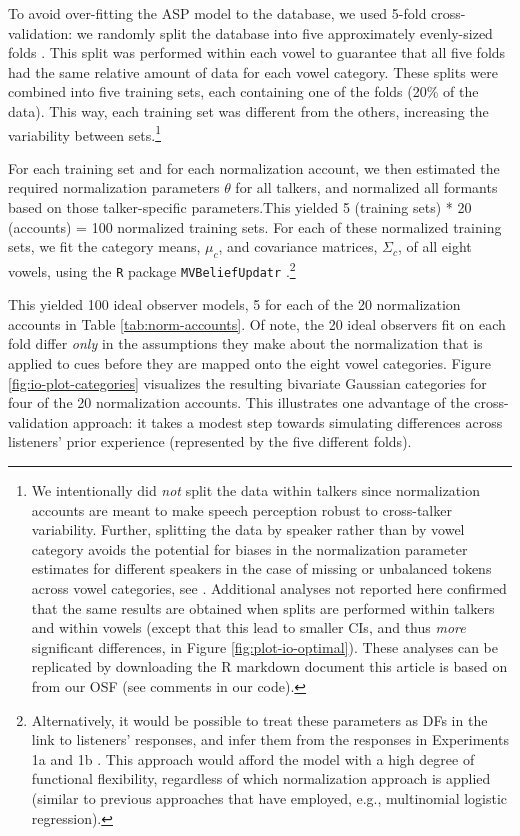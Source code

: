 \documentclass[preprint]{JASA}
\begin{document}
To avoid over-fitting the ASP model to the database, we used 5-fold cross-validation: we randomly split the \citet{xie-jaeger2020} database into five approximately evenly-sized folds \citep[following][]{persson-jaeger2023}. This split was performed within each vowel to guarantee that all five folds had the same relative amount of data for each vowel category. These splits were combined into five training sets, each containing one of the folds (20\% of the data). This way, each training set was different from the others, increasing the variability between sets.\footnote{We intentionally did \emph{not} split the data within talkers since normalization accounts are meant to make speech perception robust to cross-talker variability. Further, splitting the data by speaker rather than by vowel category avoids the potential for biases in the normalization parameter estimates for different speakers in the case of missing or unbalanced tokens across vowel categories, see \citep{barreda-nearey2018}. Additional analyses not reported here confirmed that the same results are obtained when splits are performed within talkers and within vowels (except that this lead to smaller CIs, and thus \emph{more} significant differences, in Figure \ref{fig:plot-io-optimal}). These analyses can be replicated by downloading the R markdown document this article is based on from our OSF (see comments in our code).}

For each training set and for each normalization account, we then estimated the required normalization parameters \(\theta\) for all talkers, and normalized all formants based on those talker-specific parameters.This yielded 5 (training sets) * 20 (accounts) = 100 normalized training sets. For each of these normalized training sets, we fit the category means, \(\mu_c\), and covariance matrices, \(\Sigma_c\), of all eight vowels, using the \texttt{R} package \texttt{MVBeliefUpdatr} \citep{R-MVBeliefUpdatr}.\footnote{Alternatively, it would be possible to treat these parameters as DFs in the link to listeners' responses, and infer them from the responses in Experiments 1a and 1b \citep[cf.,][]{kleinschmidt-jaeger2016}. This approach would afford the model with a high degree of functional flexibility, regardless of which normalization approach is applied (similar to previous approaches that have employed, e.g., multinomial logistic regression).}

This yielded 100 ideal observer models, 5 for each of the 20 normalization accounts in Table \ref{tab:norm-accounts}. Of note, the 20 ideal observers fit on each fold differ \emph{only} in the assumptions they make about the normalization that is applied to cues before they are mapped onto the eight vowel categories. Figure \ref{fig:io-plot-categories} visualizes the resulting bivariate Gaussian categories for four of the 20 normalization accounts. This illustrates one advantage of the cross-validation approach: it takes a modest step towards simulating differences across listeners' prior experience (represented by the five different folds).
\end{document}
